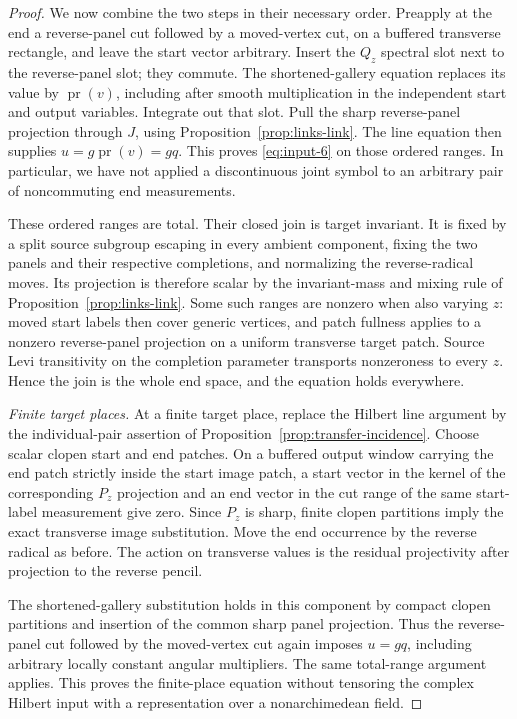 \begin{proof}
We now combine the two steps in their necessary order. Preapply at
the end a reverse-panel cut followed by a moved-vertex cut, on a
buffered transverse rectangle, and leave the start vector arbitrary.
Insert the $Q_z$ spectral slot next to the reverse-panel slot; they
commute. The shortened-gallery equation replaces its value by
$\operatorname{pr}(v)$, including after smooth multiplication in the
independent start and output variables. Integrate out that slot.
Pull the sharp reverse-panel projection through $J$, using
Proposition~\ref{prop:links-link}. The line equation then supplies
$u=g\operatorname{pr}(v)=gq$. This proves
\eqref{eq:input-6} on those ordered ranges. In particular, we have not
applied a discontinuous joint symbol to an arbitrary pair of
noncommuting end measurements.

These ordered ranges are total. Their closed join is target
invariant. It is fixed by a split source subgroup escaping in every
ambient component, fixing the two panels and their respective
completions, and normalizing the reverse-radical moves. Its projection
is therefore scalar by the invariant-mass and mixing rule of
Proposition~\ref{prop:links-link}. Some such ranges are nonzero when
also varying $z$: moved start labels then cover generic vertices, and
patch fullness applies to a nonzero reverse-panel projection on a
uniform transverse target patch. Source Levi transitivity on the
completion parameter transports nonzeroness to every $z$. Hence the
join is the whole end space, and the equation holds everywhere.

\emph{Finite target places.}
At a finite target place, replace the Hilbert line argument by the
individual-pair assertion of
Proposition~\ref{prop:transfer-incidence}. Choose scalar clopen start
and end patches. On a buffered output window carrying the end patch
strictly inside the start image patch, a start vector in the kernel
of the corresponding $P_z$ projection and an end vector in the cut
range of the same start-label measurement give zero. Since $P_z$ is
sharp, finite clopen partitions imply the exact transverse image
substitution. Move the end occurrence by the reverse radical as
before. The action on transverse values is the residual projectivity
after projection to the reverse pencil.

The shortened-gallery substitution holds in this component by compact
clopen partitions and insertion of the common sharp panel projection.
Thus the reverse-panel cut followed by the moved-vertex cut again
imposes $u=gq$, including arbitrary locally constant angular
multipliers. The same total-range argument applies. This proves the
finite-place equation without tensoring the complex Hilbert input
with a representation over a nonarchimedean field.


\end{proof}
